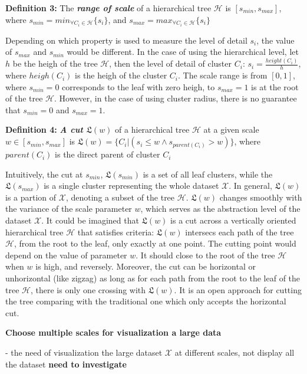\textbf{Definition 3:} The \textbf{\textit{range of scale}} of a hierarchical tree $\mathcal{H}$ is $[s_{min},s_{max}]$, where $s_{min} = min_{\forall C_i \in \mathcal{H}}\{s_i\}$, and $s_{max} = max_{\forall C_i \in \mathcal{H}}\{s_i\}$

Depending on which property is used to measure the level of detail $s_i$, the value of  $s_{max}$ and  $s_{min}$ would be different. In the case of using the hierarchical level, let $h$ be the heigh of the tree $\mathcal{H}$, then the level of detail of cluster $C_i$: $s_i = \frac{height(C_i)}{h}$, where $heigh(C_i)$ is the heigh of the cluster $C_i$. The scale range is from $[0,1]$, where $s_{min} = 0$ corresponds to the leaf with zero heigh, to $s_{max} = 1$ is at the root of the tree $\mathcal{H}$. However, in the case of using cluster radius, there is no guarantee that $s_{min} = 0$ and $s_{max} = 1$.

\textbf{Definition 4:} \textbf{\textit{A cut $\mathfrak{L}(w)$}} of a hierarchical tree $\mathcal{H}$ at a given scale $w \in [s_{min},s_{max}] $  is $\mathfrak{L}(w) = \{C_i | (s_i \leq w  \wedge s_{parent(C_i)} > w)\}$, where $parent(C_i)$ is the direct parent of cluster $C_i$

Intuitively, the cut at $s_{min}$, $\mathfrak{L}(s_{min})$ is a set of all leaf clusters, while the $\mathfrak{L}(s_{max})$ is a single cluster representing the whole dataset $\mathcal{X}$. In general, $\mathfrak{L}(w)$ is a partion of $\mathcal{X}$, denoting a subset of the tree $\mathcal{H}$. $\mathfrak{L}(w)$ changes smoothly with the variance of the scale parameter $w$, which serves as the abstraction level of the dataset $\mathcal{X}$. It could be imagined that $\mathfrak{L}(w)$ is a cut across a vertically oriented hierarchical tree $\mathcal{H}$ that satisfies criteria: $\mathfrak{L}(w)$ intersecs each path of the tree $\mathcal{H}$, from the root to the leaf, only exactly at one point. The cutting point would depend on the value of parameter $w$. It should close to the root of the tree $\mathcal{H}$ when $w$ is high, and reversely. Moreover, the cut can be horizontal or unhorizontal (like zigzag) as long as for each path from the root to the leaf of the tree $\mathcal{H}$, there is only one crossing with $\mathfrak{L}(w)$. It is an open approach for cutting the tree comparing with the traditional one which only accepts the horizontal cut. 

\textbf{Choose multiple scales for visualization a large data}

- the need of visualization the large dataset $\mathcal{X}$ at different scales, not display all the dataset \textbf{need to investigate}

